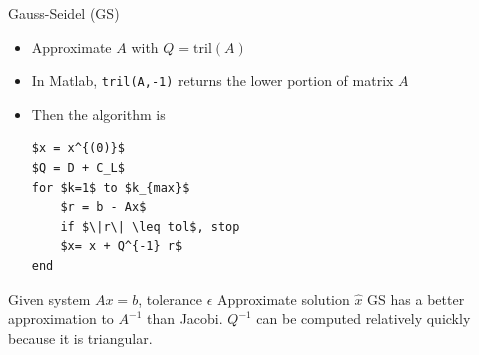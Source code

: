 \documentclass[10pt]{beamer}
\begin{document}

\begin{frame}[fragile]{Gauss-Seidel (GS)}
\begin{itemize}
    \item Approximate $A$ with $Q =\mathrm{tril}(A)$
    \item In Matlab, \texttt{tril(A,-1)} returns the lower portion of matrix $A$
    \item Then the algorithm is 
\begin{lstlisting}[mathescape]
$x = x^{(0)}$
$Q = D + C_L$ 
for $k=1$ to $k_{max}$
    $r = b - Ax$
    if $\|r\| \leq tol$, stop
    $x= x + Q^{-1} r$
end
\end{lstlisting}
\end{itemize}
\vspace{0.1in}
{Given system $Ax=b$, tolerance $\epsilon$}
{Approximate solution $\hat{x}$}
{GS has a better approximation to $A^{-1}$ than Jacobi. $Q^{-1}$ can be computed relatively quickly because it is triangular.}
\end{frame}
\end{document}
